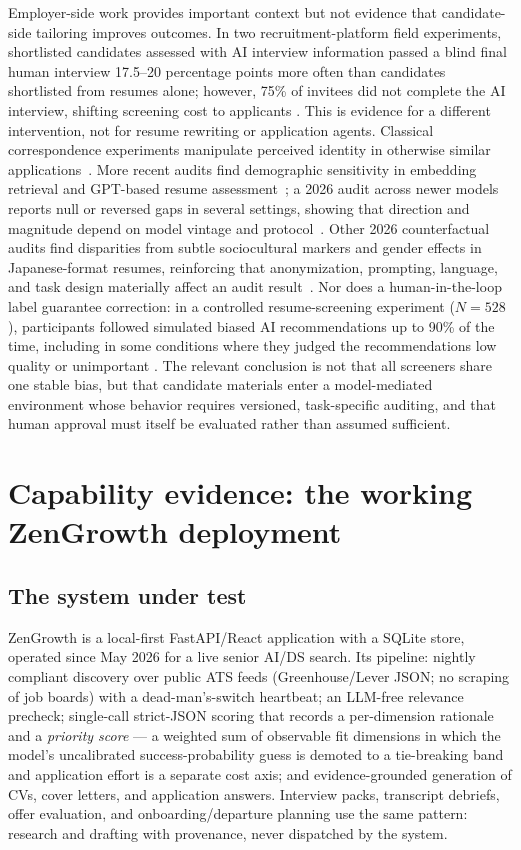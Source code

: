 \documentclass[11pt]{article}
\begin{document}
Employer-side work provides important context but not evidence that
candidate-side tailoring improves outcomes. In two recruitment-platform field
experiments, shortlisted candidates assessed with AI interview information
passed a blind final human interview 17.5--20 percentage points more often than
candidates shortlisted from resumes alone; however, 75\% of invitees did not
complete the AI interview, shifting screening cost to applicants
\citep{aka2026bettertogether}. This is evidence for a different intervention,
not for resume rewriting or application agents. Classical correspondence
experiments manipulate perceived identity in otherwise similar
applications~\citep{bertrand2004emily}. More recent audits
find demographic sensitivity in embedding retrieval and GPT-based resume
assessment~\citep{wilson2024resume,armstrong2024silicon}; a 2026 audit across
newer models reports null or reversed gaps in several settings, showing that
direction and magnitude depend on model vintage and protocol~\citep{gao2026hire}.
Other 2026 counterfactual audits find disparities from subtle sociocultural
markers and gender effects in Japanese-format resumes, reinforcing that
anonymization, prompting, language, and task design materially affect an audit
result~\citep{tan2026smallchanges,hoffstedde2026japanese}.
Nor does a human-in-the-loop label guarantee correction: in a controlled
resume-screening experiment ($N=528$), participants followed simulated biased
AI recommendations up to 90\% of the time, including in some conditions where
they judged the recommendations low quality or unimportant
\citep{wilson2025nothoughts}.
The relevant conclusion is not that all screeners share one stable bias, but
that candidate materials enter a model-mediated environment whose behavior
requires versioned, task-specific auditing, and that human approval must itself
be evaluated rather than assumed sufficient.

\section{Capability evidence: the working ZenGrowth deployment}
\label{sec:deployment}

\subsection{The system under test}

ZenGrowth is a local-first FastAPI/React application with a SQLite store,
operated since May 2026 for a live senior AI/DS search. Its pipeline:
nightly compliant discovery over public ATS feeds (Greenhouse/Lever JSON;
no scraping of job boards) with a dead-man's-switch heartbeat; an LLM-free
relevance precheck; single-call strict-JSON scoring that records a
per-dimension rationale and a \emph{priority score} --- a weighted sum of
observable fit dimensions in which the model's uncalibrated
success-probability guess is demoted to a tie-breaking band and application
effort is a separate cost axis; and evidence-grounded generation of CVs,
cover letters, and application answers. Interview packs, transcript debriefs,
offer evaluation, and onboarding/departure planning use the same pattern:
research and drafting with provenance, never dispatched by the system.
\end{document}
